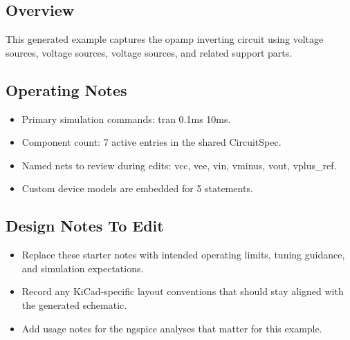 \subsection*{Overview}
This generated example captures the opamp inverting circuit using voltage sources, voltage sources, voltage sources, and related support parts.

\subsection*{Operating Notes}
\begin{itemize}
  \item Primary simulation commands: tran 0.1ms 10ms.
  \item Component count: 7 active entries in the shared CircuitSpec.
  \item Named nets to review during edits: vcc, vee, vin, vminus, vout, vplus\_ref.
  \item Custom device models are embedded for 5 statements.
\end{itemize}
\subsection*{Design Notes To Edit}
\begin{itemize}
  \item Replace these starter notes with intended operating limits, tuning guidance, and simulation expectations.
  \item Record any KiCad-specific layout conventions that should stay aligned with the generated schematic.
  \item Add usage notes for the ngspice analyses that matter for this example.
\end{itemize}
